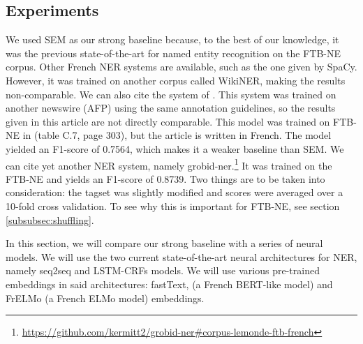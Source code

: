 \subsection{Experiments}

We used SEM \cite{dupont-2017-exploration} as our strong baseline because, to the best of our knowledge, it was the previous state-of-the-art for named entity recognition on the FTB-NE corpus.
Other French NER systems are available, such as the one given by SpaCy. However, it was trained on another corpus called WikiNER, making the results non-comparable.
We can also cite the system of \cite{stern-etal-2012-joint}. This system was trained on another newswire (AFP) using the same annotation guidelines, so the results given in this article are not directly comparable. This model was trained on FTB-NE in  (table C.7, page 303), but the article is written in French. The model yielded an F1-score of 0.7564, which makes it a weaker baseline than SEM.
We can cite yet another NER system, namely grobid-ner.\footnote{\url{https://github.com/kermitt2/grobid-ner\#corpus-lemonde-ftb-french}} It was trained on the FTB-NE and yields an F1-score of 0.8739. Two things are to be taken into consideration: the tagset was slightly modified and scores were averaged over a 10-fold cross validation. To see why this is important for FTB-NE, see section \ref{subsubsec:shuffling}.

In this section, we will compare our strong baseline with a series of neural models. We will use the two current state-of-the-art neural architectures for NER, namely seq2seq and LSTM-CRFs models. We will use various pre-trained embeddings in said architectures: fastText, \camembert (a French BERT-like model) and FrELMo (a French ELMo model) embeddings.


